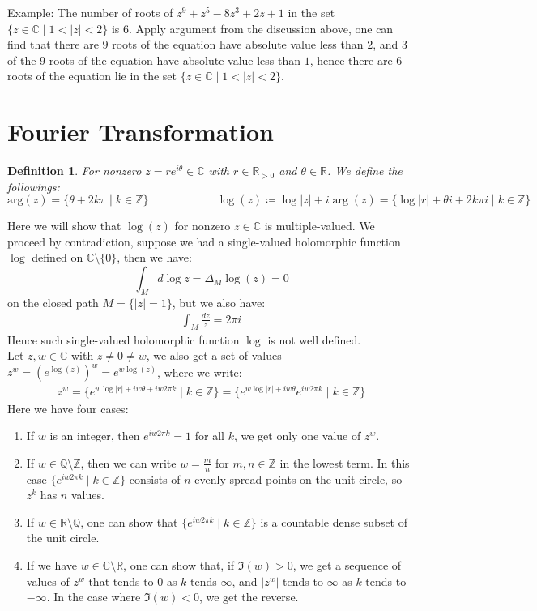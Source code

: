 \documentclass[11pt,oneside]{book}
\theoremstyle{break}
\theoremstyle{break}
\newtheorem{defn}{Definition}[corL]
\newcommand{\R}{\mathbb{R}}
\newcommand{\Z}{\mathbb{Z}}
\newcommand{\Q}{\mathbb{Q}}
\newcommand{\Complex}{\mathbb{C}}
\newcommand{\example}{\color{green}Example: \color{black}}
\begin{document}
\example The number of roots of $z^9 + z^5 - 8z^3 + 2z +1$ in the set $\{z\in \Complex \mid 1< |z|<2\}$ is $6$. Apply argument from the discussion above, one can find that there are $9$ roots of the equation have absolute value less than $2$, and $3$ of the $9$ roots of the equation have absolute value less than $1$, hence there are $6$ roots of the equation lie in the set $\{z\in \Complex \mid 1< |z|<2\}$.


\newpage
\section[Fourier Transform]{\color{red} Fourier Transformation \color{black}}
\begin{defn}
For nonzero $z = re^{i\theta}\in \Complex$ with $r \in \R_{>0}$ and $\theta \in \R$. We define the followings:
$$\text{arg}(z) = \{ \theta +2k \pi \mid k \in \Z\} \qquad\qquad\qquad \log(z) \coloneqq \log|z|+i \arg(z) = \{\log|r| +\theta i + 2k \pi i \mid k \in \Z\}$$
\end{defn}

Here we will show that $\log(z)$ for nonzero $z \in \Complex$ is multiple-valued. We proceed by contradiction, suppose we had a single-valued holomorphic function $\log$ defined on $\Complex\setminus \{0\}$, then we have: 
$$\int_{M}d\log z = \Delta_M \log(z) = 0$$ on the closed path $M= \{|z| = 1\}$, but we also have:
\begin{align*}
\int_M \frac{dz}{z} = 2\pi i
\end{align*}
Hence such single-valued holomorphic function $\log$ is not well defined.\\

Let $z,w \in \Complex$ with $z \neq 0 \neq w$, we also get a set of values $z^w = (e^{\log(z)})^{w} = e^{w \log(z)}$, where we write:
\begin{align*}
z^w = \{ e^{w \log|r| + iw \theta + i w 2\pi k} \mid k \in \Z\} = \{ e^{w\log|r| + i w \theta} e^{iw 2\pi k}\mid k \in \Z\}
\end{align*}
Here we have four cases:
\begin{enumerate}[topsep=3pt,itemsep=-1ex,partopsep=1ex,parsep=1ex]
\item If $w$ is an integer, then $e^{iw 2\pi k} = 1$ for all $k$, we get only one value of $z^w$.
\item If $w \in \Q \setminus \Z$, then we can write $w = \frac{m}{n}$ for $m,n \in \Z$ in the lowest term. In this case $\{e^{iw 2\pi k}\mid k \in \Z\}$ consists of $n$ evenly-spread points on the unit circle, so $z^k$ has $n$ values.
\item If $w \in \R \setminus \Q$, one can show that $\{e^{iw 2\pi k}\mid k \in \Z\}$ is a countable dense subset of the unit circle. 
\item If we have $w \in \Complex \setminus \R$, one can show that, if $\Im(w) >0$, we get a sequence of values of $z^w$ that tends to $0$ as $k$ tends $\infty$, and $|z^w|$ tends to $\infty$ as $k$ tends to $-\infty$. In the case where $\Im(w)<0$, we get the reverse.
\end{enumerate}
\end{document}
